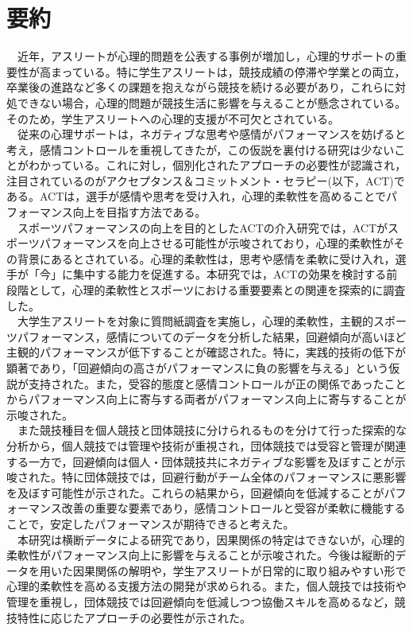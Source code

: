 \documentclass[12pt,a4paper,xelatex,ja=standard]{bxjsarticle}
\begin{document}
\clearpage

\hypertarget{ux8981ux7d04}{%
\section{要約}\label{ux8981ux7d04}}

　近年，アスリートが心理的問題を公表する事例が増加し，心理的サポートの重要性が高まっている。特に学生アスリートは，競技成績の停滞や学業との両立，卒業後の進路など多くの課題を抱えながら競技を続ける必要があり，これらに対処できない場合，心理的問題が競技生活に影響を与えることが懸念されている。そのため，学生アスリートへの心理的支援が不可欠とされている。\\
　従来の心理サポートは，ネガティブな思考や感情がパフォーマンスを妨げると考え，感情コントロールを重視してきたが，この仮説を裏付ける研究は少ないことがわかっている。これに対し，個別化されたアプローチの必要性が認識され，注目されているのがアクセプタンス＆コミットメント・セラピー(以下，ACT)である。ACTは，選手が感情や思考を受け入れ，心理的柔軟性を高めることでパフォーマンス向上を目指す方法である。\\
　スポーツパフォーマンスの向上を目的としたACTの介入研究では，ACTがスポーツパフォーマンスを向上させる可能性が示唆されており，心理的柔軟性がその背景にあるとされている。心理的柔軟性は，思考や感情を柔軟に受け入れ，選手が「今」に集中する能力を促進する。本研究では，ACTの効果を検討する前段階として，心理的柔軟性とスポーツにおける重要要素との関連を探索的に調査した。\\
　大学生アスリートを対象に質問紙調査を実施し，心理的柔軟性，主観的スポーツパフォーマンス，感情についてのデータを分析した結果，回避傾向が高いほど主観的パフォーマンスが低下することが確認された。特に，実践的技術の低下が顕著であり，「回避傾向の高さがパフォーマンスに負の影響を与える」という仮説が支持された。また，受容的態度と感情コントロールが正の関係であったことからパフォーマンス向上に寄与する両者がパフォーマンス向上に寄与することが示唆された。\\
　また競技種目を個人競技と団体競技に分けられるものを分けて行った探索的な分析から，個人競技では管理や技術が重視され，団体競技では受容と管理が関連する一方で，回避傾向は個人・団体競技共にネガティブな影響を及ぼすことが示唆された。特に団体競技では，回避行動がチーム全体のパフォーマンスに悪影響を及ぼす可能性が示された。これらの結果から，回避傾向を低減することがパフォーマンス改善の重要な要素であり，感情コントロールと受容が柔軟に機能することで，安定したパフォーマンスが期待できると考えた。\\
　本研究は横断データによる研究であり，因果関係の特定はできないが，心理的柔軟性がパフォーマンス向上に影響を与えることが示唆された。今後は縦断的データを用いた因果関係の解明や，学生アスリートが日常的に取り組みやすい形で心理的柔軟性を高める支援方法の開発が求められる。また，個人競技では技術や管理を重視し，団体競技では回避傾向を低減しつつ協働スキルを高めるなど，競技特性に応じたアプローチの必要性が示された。
\end{document}
